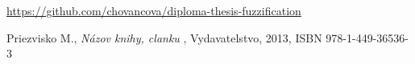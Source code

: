 \begin{thebibliography}{99}                               
	 \label{literatura}
\url{https://github.com/chovancova/diploma-thesis-fuzzification} 

 Priezvisko M., {\it Názov knihy, clanku} , 
Vydavatelstvo, 2013, ISBN 978-1-449-36536-3
        
\end{thebibliography}